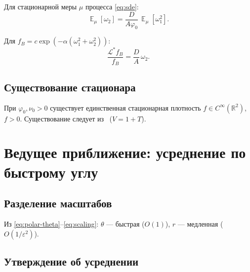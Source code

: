 \documentclass[12pt,a4paper]{article}
\DeclareMathOperator{\E}{\mathbb{E}}
\newcommand{\phiz}{\varphi_0}
\newcommand{\nuz}{\nu_0}
\begin{document}
\begin{proposition}\label{prop:moment}
Для стационарной меры $\mu$ процесса \eqref{eq:sde}:
\begin{equation}\label{eq:moment}
  \E_\mu[\omega_2]=\frac{D}{A\phiz}\,\E_\mu[\omega_1^2].
\end{equation}
\end{proposition}

\begin{proposition}\label{prop:defect}
Для $f_B=c\exp(-\alpha(\omega_1^2+\omega_2^2))$:
\begin{equation}\label{eq:defect}
  \frac{\mathcal{L}^*f_B}{f_B}=\frac{D}{A}\,\omega_2.
\end{equation}
\end{proposition}

\subsection{Существование стационара}

\begin{proposition}\label{prop:exist}
При $\phiz,\nuz>0$ существует единственная стационарная плотность $f\in C^\infty(\mathbb{R}^2)$,
$f>0$. Существование следует из~\cite{Khasminskii2012} ($V=1+T$).
\end{proposition}

\section{Ведущее приближение: усреднение по быстрому углу}

\subsection{Разделение масштабов}

Из \eqref{eq:polar-theta}--\eqref{eq:scaling}: $\theta$ --- быстрая ($O(1)$), $r$ --- медленная ($O(1/\varepsilon^2)$).

\subsection{Утверждение об усреднении}
\end{document}
